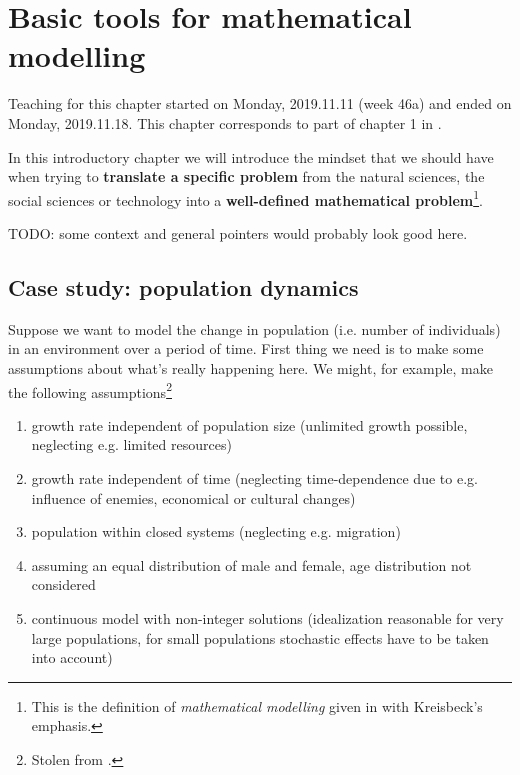 \chapter{Basic tools for mathematical modelling}

Teaching for this chapter started on Monday, 2019.11.11 (week 46a) and ended on
Monday, 2019.11.18. This chapter corresponds to part of chapter 1 in
\cite{eck2017mathematical}.

In this introductory chapter we will introduce the mindset that we should have
when trying to \textbf{translate a specific problem} from the natural sciences,
the social sciences or technology into a \textbf{well-defined mathematical
problem}\footnote{This is the definition of \textit{mathematical modelling}
given in \cite[p.  1]{eck2017mathematical} with Kreisbeck's emphasis.}.

TODO: some context and general pointers would probably look good here.

\section{Case study: population dynamics}

Suppose we want to model the change in population (i.e. number of individuals)
in an environment over a period of time. First thing we need is to make some
assumptions about what's really happening here. We might, for example, make the
following assumptions\footnote{Stolen from \cite{kreisbeck2019slides}.}

\begin{enumerate}
  \item growth rate independent of population size (unlimited growth possible,
    neglecting e.g. limited resources)

  \item growth rate independent of time (neglecting time-dependence due to e.g.
    influence of enemies, economical or cultural changes)

  \item population within closed systems (neglecting e.g. migration)

  \item assuming an equal distribution of male and female, age distribution not
    considered

  \item continuous model with non-integer solutions (idealization reasonable
    for very large populations, for small populations stochastic effects have
    to be taken into account)
\end{enumerate}

